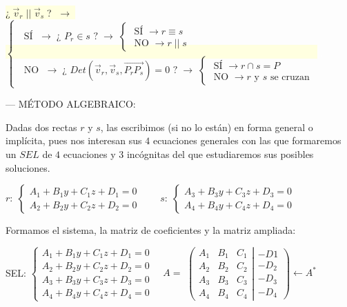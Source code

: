   \noindent \colorbox{LightYellow}{\footnotesize {¿$\;\vec v_r \; || \; \vec v_s\;$? 
 $\; \to \;$
 $\begin{cases} 
\; \text{ SÍ } \; \to \; \text{¿ } P_r \in s \text{ ?}\; \to \; 
	\begin{cases} 
	\text{ SÍ } \to r\equiv s
	\\ \text{ NO } \to r\;||\;s
	\end{cases}       
\\ \; \text{ NO } \; \to \; \text{¿ } Det(\vec v_r, \vec v_s, \overrightarrow{P_rP_s})=0 \text{ ?}\; \to \; 
	\begin{cases}
	\text{ SÍ } \to r\cap s=P
	\\ \text{ NO } \to r \text{ y } s \text{ se cruzan}
	\end{cases}
\end{cases}$}} \normalsize{\textcolor{white}{.}}
 
 --- MÉTODO ALGEBRAICO:
 
 \noindent Dadas dos rectas $r$ y $s$, las escribimos (si no lo están) en forma general o implícita, pues nos interesan sus $4$ ecuaciones generales con las que formaremos un $SEL$ de $4$ ecuaciones y $3$ incógnitas del que estudiaremos sus posibles soluciones.
 
\noindent $r:\; \begin{cases} A_1+B_1y+C_1z+D_1=0\\ A_2+B_2y+C_2z+D_2=0 \end{cases} \qquad s:\; \begin{cases} A_3+B_3y+C_3z+D_3=0\\ A_4+B_4y+C_4z+D_4=0 \end{cases}$

\noindent Formamos el sistema, la matriz de coeficientes y la matriz ampliada:

\noindent SEL: $ \begin{cases} A_1+B_1y+C_1z+D_1=0\\ A_2+B_2y+C_2z+D_2=0  \\ A_3+B_3y+C_3z+D_3=0\\ A_4+B_4y+C_4z+D_4=0 \end{cases} \quad A= $
$ \left( \begin{matrix}
A_1&B_1&C_1\\A_2&B_2&C_2\\A_3&B_3&C_3\\A_4&B_4&C_4 \end{matrix}
 \right| \left. \begin{matrix} -D1\\-D_2\\-D_3\\-D_4 \end{matrix}\right) \leftarrow A^*$
 
